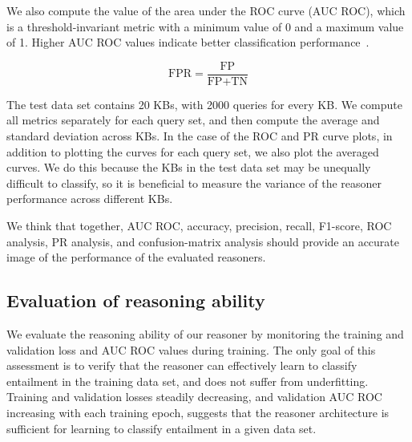 We also compute the value of the area under the ROC curve (AUC ROC), which is a threshold-invariant metric with a minimum value of 0 and a maximum value of 1.
Higher AUC ROC values indicate better classification performance~\cite{fawcett_introduction_2006}.

\begin{equation}
\label{eq:metric-fpr}
\text{FPR} = \frac{\text{FP}}{\text{FP} + \text{TN}}
\end{equation}

The test data set contains 20 KBs, with 2000 queries for every KB.
We compute all metrics separately for each query set, and then compute the average and standard deviation across KBs.
In the case of the ROC and PR curve plots, in addition to plotting the curves for each query set, we also plot the averaged curves.   
We do this because the KBs in the test data set may be unequally difficult to classify, so it is beneficial to measure the variance of the reasoner performance across different KBs.

We think that together, AUC ROC, accuracy, precision, recall, F1-score, ROC analysis, PR analysis, and confusion-matrix analysis should provide an accurate image of the performance of the evaluated reasoners.


\subsection{Evaluation of reasoning ability}

We evaluate the reasoning ability of our reasoner by monitoring the training and validation loss and AUC ROC values during training.
The only goal of this assessment is to verify that the reasoner can effectively learn to classify entailment in the training data set, and does not suffer from underfitting.
Training and validation losses steadily decreasing, and validation AUC ROC increasing with each training epoch, suggests that the reasoner architecture is sufficient for learning to classify entailment in a given data set.

